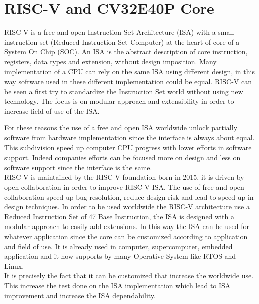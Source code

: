\chapter{RISC-V and CV32E40P Core}{
	RISC-V is a free and open Instruction Set Architecture (ISA) with a small instruction set (Reduced Instruction Set Computer) at the heart of core of a System On Chip (SOC).
	An ISA is the abstract description of core instruction, registers, data types and extension, without design imposition. 
	Many implementation of a CPU can rely on the same ISA  using different design, in this way software used in these different implementation could be equal.
	RISC-V can be seen a first try to standardize the Instruction Set world without using new technology.
	The focus is on modular approach and extensibility in order to increase field of use of the ISA.
    
    For these reasons the use of a free and open ISA worldwide unlock partially software from hardware implementation since the interface is always about equal.
    This subdivision speed up computer CPU progress with lower efforts in software support.
    Indeed companies efforts can be focused more on design and less on software support since the interface is the same.\\
    
    RISC-V is maintained by the RISC-V foundation born in 2015, it is driven by open collaboration in order to improve RISC-V ISA.
    The use of free and open collaboration speed up bug resolution, reduce design risk and lead to speed up in design techniques.
    In order to be used worldwide the RISC-V architecture use a Reduced Instruction Set  of 47 Base Instruction, the ISA is designed with a modular approach to easily add extensions. 
    In this way the ISA can be used for whatever application since the core can be customized according to application and field of use.
    It is already used in computer, supercomputer, embedded application and it now supports by many Operative System like RTOS and Linux.\\
    
    It is precisely the fact that it can be customized that increase the worldwide use.
    This increase the test done on the ISA implementation which lead to ISA improvement and increase the ISA dependability.
    
}
